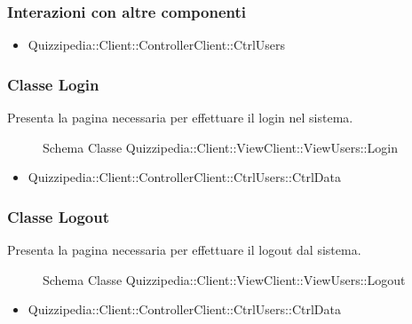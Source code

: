 \subsubsection{Interazioni con altre componenti}
\begin{itemize}
\item Quizzipedia::Client::ControllerClient::CtrlUsers
\end{itemize}
\subsubsection{Classe Login}
Presenta la pagina necessaria per effettuare il login nel sistema.
\begin{figure}[H]
\centering
\noindent{}
\caption[Schema Classe Login]{Schema Classe Quizzipedia::Client::ViewClient::ViewUsers::Login}
\end{figure}
\begin{itemize}
\item Quizzipedia::Client::ControllerClient::CtrlUsers::CtrlData
\end{itemize}
\subsubsection{Classe Logout}
Presenta la pagina necessaria per effettuare il logout dal sistema.
\begin{figure}[H]
\centering
\noindent{}
\caption[Schema Classe Logout]{Schema Classe Quizzipedia::Client::ViewClient::ViewUsers::Logout}
\end{figure}
\begin{itemize}
\item Quizzipedia::Client::ControllerClient::CtrlUsers::CtrlData
\end{itemize}
